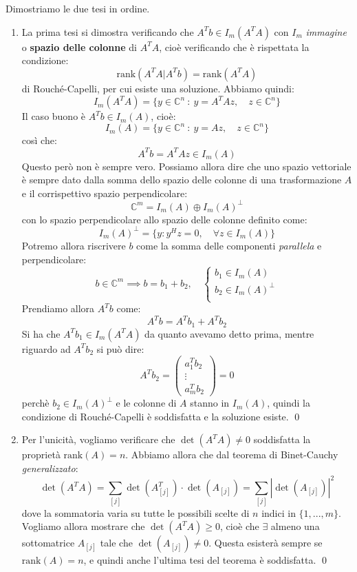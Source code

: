 \documentclass[a4paper,11pt]{article}
\begin{document}
Dimostriamo le due tesi in ordine.
\begin{enumerate}
	\item 
La prima tesi si dimostra verificando che $A^T b \in I_m(A^T A)$ con $I_m$ \textit{immagine} o \textbf{spazio delle colonne} di $A^T A$, cioè verificando che è rispettata la condizione:
$$
\mathrm{rank}(A^T A | A^T b) = \mathrm{rank}(A^T A)
$$
di Rouché-Capelli, per cui esiste una soluzione.
Abbiamo quindi:
$$
I_m (A^T A) = \{ y \in \mathbb{C}^n \ : \ y = A^T A z, \quad z \in \mathbb{C}^n \}
$$
Il caso buono è $A^T b \in I_m(A)$, cioè:
$$
I_m (A) = \{ y \in \mathbb{C}^n \ : \ y = A z, \quad z \in \mathbb{C}^n \}
$$
così che:
$$
A^T b = A^T A z \in I_m (A)
$$
Questo però non è sempre vero.
Possiamo allora dire che uno spazio vettoriale è sempre dato dalla somma dello spazio delle colonne di una trasformazione $A$ e il corrispettivo spazio perpendicolare: 
$$
\mathbb{C}^m = I_m(A) \oplus I_m(A)^\perp
$$
con lo spazio perpendicolare allo spazio delle colonne definito come:
$$
I_m(A)^\perp = \{ y : y^H z = 0, \quad \forall z \in I_m(A) \}
$$
Potremo allora riscrivere $b$ come la somma delle componenti \textit{parallela} e perpendicolare:
$$
b \in \mathbb{C}^m \implies b = b_1 + b_2, \quad
	\begin{cases}
		b_1 \in I_m(A) \\ 
		b_2 \in I_m(A)^\perp \\ 
	\end{cases}
$$
Prendiamo allora $A^T b$ come:
$$
A^T b = A^T b_1 + A^T b_2
$$
Si ha che $A^T b_1 \in I_m (A^T A)$ da quanto avevamo detto prima, mentre riguardo ad $A^T b_2$ si può dire:
$$
A^T b_2 = \begin{pmatrix}
	a_1^T b_2 \\
	\vdots \\
	a_m^T b_2
\end{pmatrix} = 0
$$
perchè $b_2 \in I_m(A)^\perp$ e le colonne di $A$ stanno in $I_m(A)$, quindi la condizione di Rouché-Capelli è soddisfatta e la soluzione esiste.
\qed

\item 
Per l'unicità, vogliamo verificare che $\det(A^T A) \neq 0$ soddisfatta la proprietà $\mathrm{rank}(A) = n$.
Abbiamo allora che dal teorema di Binet-Cauchy \textit{generalizzato}:
$$
\det(A^T A) = \sum_{[j]} \det(A_{[j]}^T) \cdot \det(A_{[j]}) = \sum_{[j]} |\det(A_{[j]})|^2
$$
dove la sommatoria varia su tutte le possibili scelte di $n$ indici in $\{ 1, ..., m \}$.
Vogliamo allora mostrare che $\det(A^T A) \geq 0$, cioè che $\exists$ almeno una sottomatrice $A_{[j]}$ tale che $\det(A_{[j]}) \neq 0$.
Questa esisterà sempre se $\mathrm{rank}(A) = n$, e quindi anche l'ultima tesi del teorema è soddisfatta. \qed 
\end{enumerate}
\end{document}
